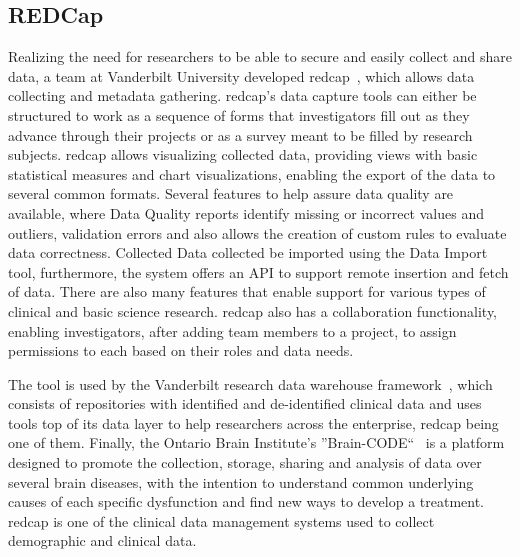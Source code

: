 \subsection*{REDCap}
Realizing the need for researchers to be able to secure and easily collect and share data, a team at Vanderbilt University developed \gls{redcap}~\cite{redcap}, which allows data collecting and metadata gathering.
\gls{redcap}'s data capture tools can either be structured to work as a sequence of forms that investigators fill out as they advance through their projects or as a survey meant to be filled by research subjects.
\gls{redcap} allows visualizing collected data, providing views with basic statistical measures and chart visualizations, enabling the export of the data to several common formats.
Several features to help assure data quality are available, where Data Quality reports identify missing or incorrect values and outliers, validation errors and also allows the creation of custom rules to evaluate data correctness.
Collected Data collected be imported using the Data Import tool, furthermore, the system offers an API to support remote insertion and fetch of data.
There are also many features that enable support for various types of clinical and basic science research.
\gls{redcap} also has a collaboration functionality, enabling investigators, after adding team members to a project, to assign permissions to each based on their roles and data needs.

The tool is used by the Vanderbilt research data warehouse framework~\cite{vanderbilt}, which consists of repositories with identified and de-identified clinical data and uses tools top of its data layer to help researchers across the enterprise, \gls{redcap} being one of them.
Finally, the Ontario Brain Institute’s ''Brain-CODE``~\cite{braincode} is a platform designed to promote the collection, storage, sharing and analysis of data over several brain diseases, with the intention to understand common underlying causes of each specific dysfunction and find new ways to develop a treatment.
\gls{redcap} is one of the clinical data management systems used to
collect demographic and clinical data.

